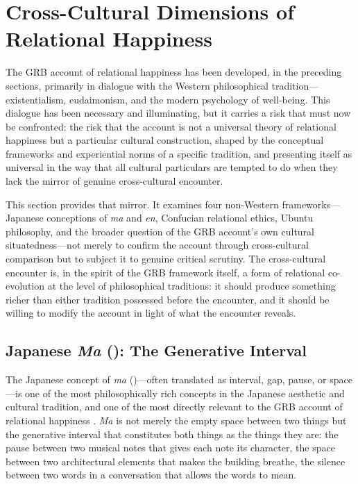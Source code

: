\section{Cross-Cultural Dimensions of Relational Happiness}
\label{p14:sec:culture}

\noindent
The GRB account of relational happiness has been developed, in the preceding sections, primarily in dialogue with the Western philosophical tradition---existentialism, eudaimonism, and the modern psychology of well-being. This dialogue has been necessary and illuminating, but it carries a risk that must now be confronted: the risk that the account is not a universal theory of relational happiness but a particular cultural construction, shaped by the conceptual frameworks and experiential norms of a specific tradition, and presenting itself as universal in the way that all cultural particulars are tempted to do when they lack the mirror of genuine cross-cultural encounter.

This section provides that mirror. It examines four non-Western frameworks---Japanese conceptions of \emph{ma} and \emph{en}, Confucian relational ethics, Ubuntu philosophy, and the broader question of the GRB account's own cultural situatedness---not merely to confirm the account through cross-cultural comparison but to subject it to genuine critical scrutiny. The cross-cultural encounter is, in the spirit of the GRB framework itself, a form of relational co-evolution at the level of philosophical traditions: it should produce something richer than either tradition possessed before the encounter, and it should be willing to modify the account in light of what the encounter reveals.

\subsection{Japanese \emph{Ma} (): The Generative Interval}
\label{p14:subsec:ma}

\noindent
The Japanese concept of \emph{ma} ()---often translated as interval, gap, pause, or space---is one of the most philosophically rich concepts in the Japanese aesthetic and cultural tradition, and one of the most directly relevant to the GRB account of relational happiness \parencite{nishida1990}. \emph{Ma} is not merely the empty space between two things but the generative interval that constitutes both things as the things they are: the pause between two musical notes that gives each note its character, the space between two architectural elements that makes the building breathe, the silence between two words in a conversation that allows the words to mean.

